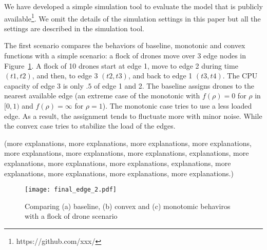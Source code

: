 
We have developed a simple simulation tool to evaluate the model
that is publicly available\footnote{https://github.com/xxx/}.
We omit the details of the simulation settings in this paper but all
the settings are described in the simulation tool.


The first scenario compares the behaviors of baseline, monotonic and
convex functions with a simple scenario: a flock of drones move
over 3 edge nodes in Figure~\ref{fig:edge}.
A flock of 10 drones start at edge 1, move to edge 2 during time
$(t1, t2)$, and then, to edge 3 $(t2, t3)$, and back to edge 1 $(t3, t4)$.
The CPU capacity of edge 3 is only $.5$ of edge 1 and 2.
The baseline assigns drones to the nearest available edge (an extreme
case of the monotonic with $f(\rho) = 0$ for $\rho$ in $[0,1)$ and
$f(\rho) = \infty$ for $\rho = 1$).
The monotonic case tries to use a less loaded edge. As a result,
the assignment tends to fluctuate more with minor noise.
While the convex case tries to stabilize the load of the edges.

(more explanations, more explanations, more explanations, more
explanations, more explanations, more explanations, more explanations,
explanations, more explanations, more explanations, more explanations,
explanations, more explanations, more explanations, more explanations,
more explanations.)

\begin{figure}[tb]
  \begin{center}
    \texttt{[image: final\_edge\_2.pdf]}
    \vspace{-4.0ex}
    \caption{Comparing (a) baseline, (b) convex and (c) monotomic behaviros with
      a flock of drone scenario}
    \smallskip
    \raggedright
    \small
    \label{fig:edge}
  \end{center}
\end{figure}

